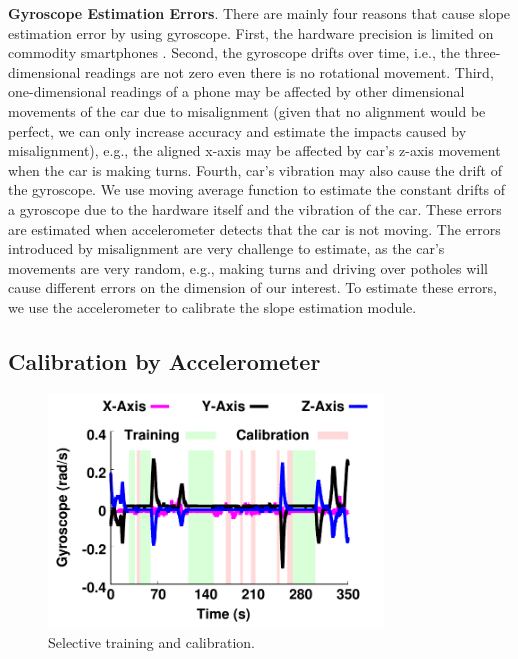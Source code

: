 \textbf{Gyroscope Estimation Errors}. 
There are mainly four reasons that cause slope estimation error by using gyroscope.  
First, the hardware precision is limited on commodity smartphones \cite{zhou2014use}.  
Second, the gyroscope drifts over time, i.e., the three-dimensional readings
are not zero even there is no rotational movement.
Third, one-dimensional readings of a phone may be affected by 
other dimensional movements of the car due
to misalignment (given that no alignment would be perfect, 
we can only increase accuracy and estimate the impacts caused by misalignment), 
e.g., the aligned x-axis may be affected by car's
z-axis movement when the car is making turns. 
Fourth, car's vibration may also cause the drift of the gyroscope.  
We use moving average function to estimate the constant drifts of a
gyroscope due to the hardware itself and the vibration of the car. 
These errors are estimated when accelerometer detects
that the car is not moving. 
The errors introduced by misalignment are very challenge to estimate, 
as the car's movements are very random, 
e.g., making turns and driving over potholes will cause different
errors on the dimension of our interest. 
To estimate these errors, we use the accelerometer to calibrate the slope estimation module.


\subsection{Calibration by Accelerometer}

\begin{figure}[!tbph]
\begin{center}
\includegraphics[width=3.5in,angle=0]{Figs/SlopeAware/training.pdf}
\vspace{0.0cm}
\caption{Selective training and calibration.}
\label{training}
\vspace{-0.3cm}
\end{center}
\end{figure}

